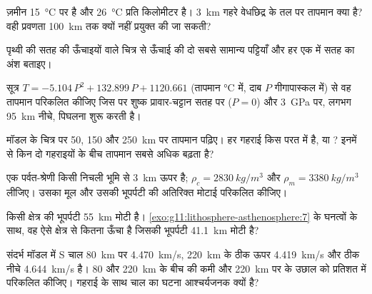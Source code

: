 \begin{exercise}[$\star$]\label{exo:g11:lithosphere-asthenosphere:3}
ज़मीन \qty{15}{\celsius} पर है और 
\qty{26}{\celsius} प्रति किलोमीटर है। \qty{3}{km} गहरे वेधछिद्र के तल पर
तापमान क्या है? वही प्रवणता \qty{100}{km} तक क्यों
नहीं प्रयुक्त की जा सकती?
\end{exercise}

\begin{exercise}[$\star$]\label{exo:g11:lithosphere-asthenosphere:4}
पृथ्वी की सतह की ऊँचाइयों वाले चित्र से ऊँचाई की दो सबसे
सामान्य पट्टियाँ और हर एक में सतह का अंश बताइए।
\end{exercise}

\begin{exercise}[$\star$]\label{exo:g11:lithosphere-asthenosphere:5}
सूत्र $T = -5.104\,P^2 + 132.899\,P + 1120.661$ (तापमान
\unit{\celsius} में, दाब $P$ गीगापास्कल में) से वह तापमान परिकलित कीजिए
जिस पर शुष्क प्रावार-चट्टान सतह पर ($P = 0$) और
\qty{3}{GPa} पर, लगभग \qty{95}{km} नीचे, पिघलना शुरू करती है।
\end{exercise}

\begin{exercise}[$\star\star$]\label{exo:g11:lithosphere-asthenosphere:6}
मॉडल  के चित्र पर 50, 150 और
\qty{250}{km} पर तापमान पढ़िए। हर गहराई किस परत में है,  या ?
इनमें से किन दो गहराइयों के बीच तापमान सबसे अधिक बढ़ता है?
\end{exercise}

\begin{exercise}[$\star\star$]\label{exo:g11:lithosphere-asthenosphere:7}
एक पर्वत-श्रेणी किसी निचली भूमि से \qty{3}{km} ऊपर है; $\rho_c =
\qty{2830}{kg/m^3}$ और $\rho_m = \qty{3380}{kg/m^3}$ लीजिए। उसका मूल और
उसकी भूपर्पटी की अतिरिक्त मोटाई परिकलित कीजिए।
\end{exercise}

\begin{exercise}[$\star\star$]\label{exo:g11:lithosphere-asthenosphere:8}
किसी क्षेत्र की भूपर्पटी \qty{55}{km} मोटी है।
\cref{exo:g11:lithosphere-asthenosphere:7} के घनत्वों के साथ, वह ऐसे
क्षेत्र से कितना ऊँचा है जिसकी भूपर्पटी \qty{41.1}{km} मोटी है?
\end{exercise}

\begin{exercise}[$\star\star$]\label{exo:g11:lithosphere-asthenosphere:9}
संदर्भ मॉडल में S चाल \qty{80}{km} पर \qty{4.470}{km/s},
\qty{220}{km} के ठीक ऊपर \qty{4.419}{km/s} और ठीक नीचे \qty{4.644}{km/s} है।
80 और \qty{220}{km} के बीच की कमी और \qty{220}{km} पर के उछाल को
प्रतिशत में परिकलित कीजिए। गहराई के साथ चाल का घटना आश्चर्यजनक क्यों है?
\end{exercise}

